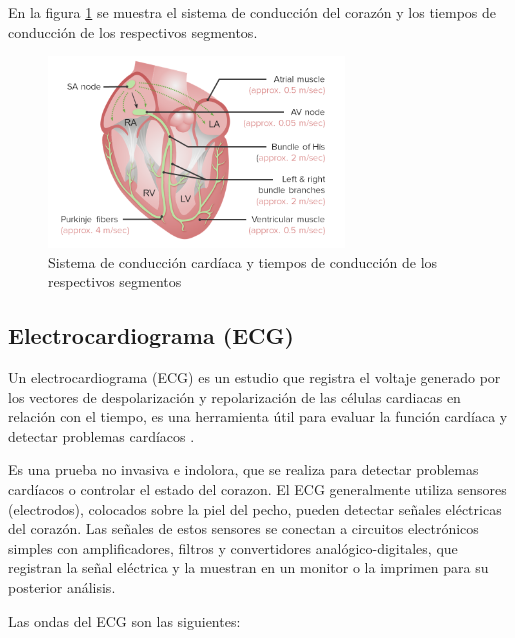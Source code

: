      En la figura \ref{fig:sistemaConduccion} se muestra el sistema de conducción del corazón y los tiempos de conducción de los respectivos segmentos.

    \begin{figure}[H]
        \centering
        \includegraphics[width=0.7\textwidth]{img/Marco/sistemaConduccion.png}
        \caption[Sistema de conducción cardíaca y tiempos de conducción de los respectivos segmentos]{Sistema de conducción cardíaca y tiempos de conducción de los respectivos segmentos\footnotemark}
        \label{fig:sistemaConduccion}
    \end{figure}

    \subsection{Electrocardiograma (ECG)}
    Un electrocardiograma (ECG) es un estudio que registra el voltaje generado por los vectores de despolarización y repolarización de las células cardiacas en relación con el tiempo, es una herramienta útil para evaluar la función cardíaca y detectar problemas cardíacos \cite{ECG_Definicion}.

    Es una prueba no invasiva e indolora, que se realiza para detectar problemas cardíacos o controlar el estado del corazon. El ECG generalmente utiliza sensores (electrodos), colocados sobre la piel del pecho, pueden detectar señales eléctricas del corazón. Las señales de estos sensores se conectan a circuitos electrónicos simples con amplificadores, filtros y convertidores analógico-digitales, que registran la señal eléctrica y la muestran en un monitor o la imprimen para su posterior análisis.

    Las ondas del ECG son las siguientes:

